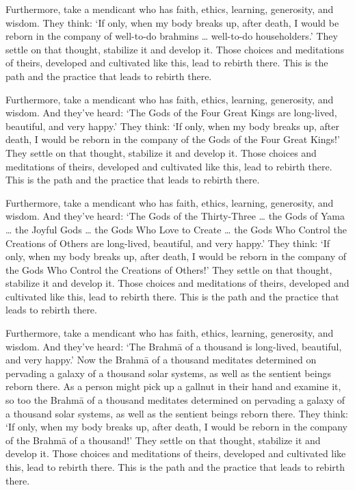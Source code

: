 \documentclass[12pt,openany]{book}%
\begin{document}
Furthermore, take a mendicant who has faith, ethics, learning, generosity, and wisdom. They think: ‘If only, when my body breaks up, after death, I would be reborn in the company of well-to-do brahmins … well-to-do householders.’ They settle on that thought, stabilize it and develop it. Those choices and meditations of theirs, developed and cultivated like this, lead to rebirth there. This is the path and the practice that leads to rebirth there. 

Furthermore, take a mendicant who has faith, ethics, learning, generosity, and wisdom. And they’ve heard: ‘The Gods of the Four Great Kings are long-lived, beautiful, and very happy.’ They think: ‘If only, when my body breaks up, after death, I would be reborn in the company of the Gods of the Four Great Kings!’ They settle on that thought, stabilize it and develop it. Those choices and meditations of theirs, developed and cultivated like this, lead to rebirth there. This is the path and the practice that leads to rebirth there. 

Furthermore, take a mendicant who has faith, ethics, learning, generosity, and wisdom. And they’ve heard: ‘The Gods of the Thirty-Three … the Gods of Yama … the Joyful Gods … the Gods Who Love to Create … the Gods Who Control the Creations of Others are long-lived, beautiful, and very happy.’ They think: ‘If only, when my body breaks up, after death, I would be reborn in the company of the Gods Who Control the Creations of Others!’ They settle on that thought, stabilize it and develop it. Those choices and meditations of theirs, developed and cultivated like this, lead to rebirth there. This is the path and the practice that leads to rebirth there. 

Furthermore, take a mendicant who has faith, ethics, learning, generosity, and wisdom. And they’ve heard: ‘The \textsanskrit{Brahmā} of a thousand is long-lived, beautiful, and very happy.’ Now the \textsanskrit{Brahmā} of a thousand meditates determined on pervading a galaxy of a thousand solar systems, as well as the sentient beings reborn there. As a person might pick up a gallnut in their hand and examine it, so too the \textsanskrit{Brahmā} of a thousand meditates determined on pervading a galaxy of a thousand solar systems, as well as the sentient beings reborn there. They think: ‘If only, when my body breaks up, after death, I would be reborn in the company of the \textsanskrit{Brahmā} of a thousand!’ They settle on that thought, stabilize it and develop it. Those choices and meditations of theirs, developed and cultivated like this, lead to rebirth there. This is the path and the practice that leads to rebirth there. 
\end{document}
